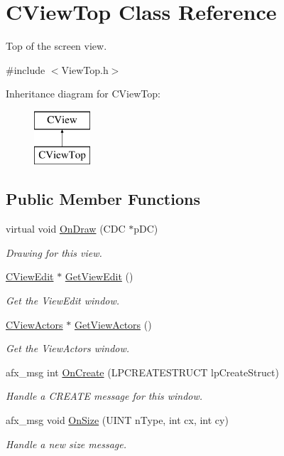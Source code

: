 \hypertarget{class_c_view_top}{\section{C\+View\+Top Class Reference}
\label{class_c_view_top}
}


Top of the screen view.  




{\ttfamily \#include $<$View\+Top.\+h$>$}

Inheritance diagram for C\+View\+Top\+:\begin{figure}[H]
\begin{center}
\leavevmode
\includegraphics[height=2.000000cm]{class_c_view_top}
\end{center}
\end{figure}
\subsection*{Public Member Functions}
\begin{DoxyCompactItemize}
\item 
virtual void \hyperlink{class_c_view_top_ac4b8af93a75df56478f39feff289f6a6}{On\+Draw} (C\+D\+C $\ast$p\+D\+C)
\begin{DoxyCompactList}\small\item\em Drawing for this view. \end{DoxyCompactList}\item 
\hyperlink{class_c_view_edit}{C\+View\+Edit} $\ast$ \hyperlink{class_c_view_top_a775f50213ecac76ac57016bc402de42a}{Get\+View\+Edit} ()
\begin{DoxyCompactList}\small\item\em Get the View\+Edit window. \end{DoxyCompactList}\item 
\hyperlink{class_c_view_actors}{C\+View\+Actors} $\ast$ \hyperlink{class_c_view_top_a2057cf44f1f7a789b33e2ef8444b6db8}{Get\+View\+Actors} ()
\begin{DoxyCompactList}\small\item\em Get the View\+Actors window. \end{DoxyCompactList}\item 
afx\+\_\+msg int \hyperlink{class_c_view_top_a7e4cad13135855a66719ecb49a8ad3fc}{On\+Create} (L\+P\+C\+R\+E\+A\+T\+E\+S\+T\+R\+U\+C\+T lp\+Create\+Struct)
\begin{DoxyCompactList}\small\item\em Handle a C\+R\+E\+A\+T\+E message for this window. \end{DoxyCompactList}\item 
afx\+\_\+msg void \hyperlink{class_c_view_top_a171e02fdf1bef80245bbc37d77819f14}{On\+Size} (U\+I\+N\+T n\+Type, int cx, int cy)
\begin{DoxyCompactList}\small\item\em Handle a new size message. \end{DoxyCompactList}\end{DoxyCompactItemize}
